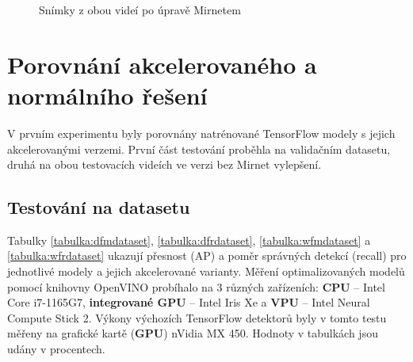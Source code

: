 \begin{figure}[H] 
  \begin{center}
  \label{obrazek:videamirnet}
  \caption{Snímky z obou videí po úpravě Mirnetem}
  \end{center}
\end{figure}

\section{Porovnání akcelerovaného a normálního řešení}
V prvním experimentu byly porovnány natrénované TensorFlow modely s jejich akcelerovanými verzemi. První část testování proběhla na validačním datasetu, druhá na obou testovacích videích ve verzi bez Mirnet vylepšení.

\subsection*{Testování na datasetu}
Tabulky \ref{tabulka:dfmdataset}, \ref{tabulka:dfrdataset}, \ref{tabulka:wfmdataset} a \ref{tabulka:wfrdataset} ukazují přesnost (AP) a poměr správných detekcí (recall) pro jednotlivé modely a jejich akcelerované varianty. Měření optimalizovaných modelů pomocí knihovny OpenVINO probíhalo na 3 různých zařízeních: \textbf{CPU} -- Intel Core i7-1165G7, \textbf{integrované GPU} -- Intel Iris Xe a \textbf{VPU} -- Intel Neural Compute Stick 2. Výkony výchozích TensorFlow detektorů byly v tomto testu měřeny na grafické kartě (\textbf{GPU}) nVidia MX 450. Hodnoty v tabulkách jsou udány v procentech.

